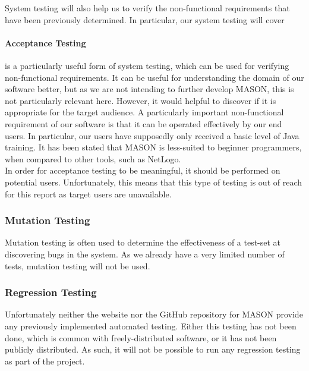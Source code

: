 \documentclass[11pt]{article}
\begin{document}
System testing will also help us to verify the non-functional requirements that have been previously determined.
In particular, our system testing will cover

\paragraph{Acceptance Testing}
is a particularly useful form of system testing, which can be used for verifying non-functional requirements.
It can be useful for understanding the domain of our software better, but as we are not intending to further develop MASON, this is not particularly relevant here.
However, it would helpful to discover if it is appropriate for the target audience.
A particularly important non-functional requirement of our software is that it can be operated effectively by our end users.
In particular, our users have supposedly only received a basic level of Java training.
It has been stated that MASON is less-suited to beginner programmers, when compared to other tools, such as NetLogo\cite{abm_platforms_review}.
\\

In order for acceptance testing to be meaningful, it should be performed on potential users.
Unfortunately, this means that this type of testing is out of reach for this report as target users are unavailable.

\subsubsection{Mutation Testing}
Mutation testing is often used to determine the effectiveness of a test-set at discovering bugs in the system.
As we already have a very limited number of tests, mutation testing will not be used.

\subsubsection{Regression Testing}
Unfortunately neither the website nor the GitHub repository for MASON provide any previously implemented automated testing.
Either this testing has not been done, which is common with freely-distributed software, or it has not been publicly distributed.
As such, it will not be possible to run any regression testing as part of the project.
\end{document}
